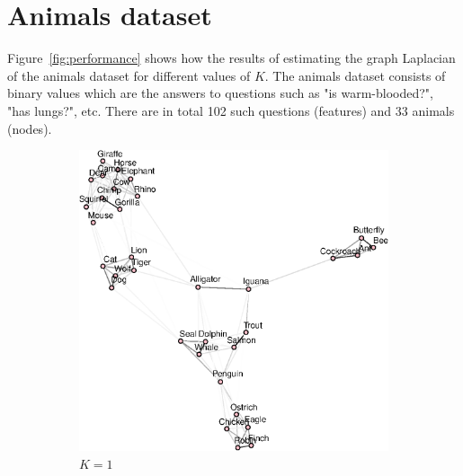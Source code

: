 \documentclass{article}
\begin{document}
\section{Animals dataset}

Figure~\ref{fig:performance} shows how the results of estimating the graph Laplacian of the \textsf{animals} dataset
for different values of $K$. The \textsf{animals} dataset consists of binary values which are the answers to questions
such as "is warm-blooded?", "has lungs?", etc. There are in total 102 such questions (features) and 33 animals (nodes).

\begin{figure}[!htb]
    \centering
    \begin{subfigure}[b]{0.35\textwidth}
        \includegraphics[width=\textwidth]{animals_graph_k1.eps}
        \caption{$K = 1$}
    \end{subfigure}
    ~
    \begin{subfigure}[b]{0.35\textwidth}

\end{subfigure}
\end{figure}
\end{document}
